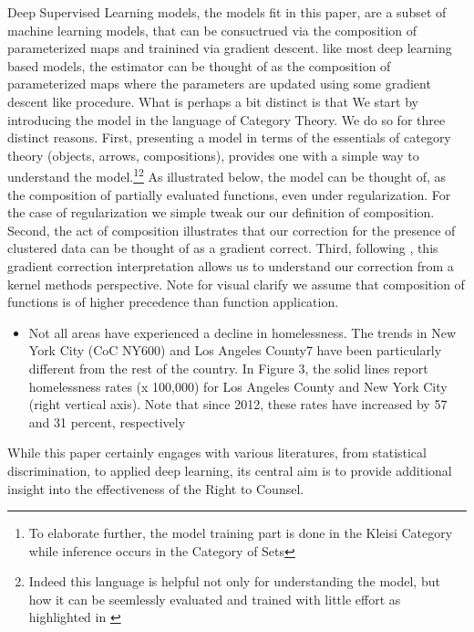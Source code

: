 \documentclass[a4paper,12pt]{article}
\begin{document}
Deep Supervised Learning models, the models fit in this paper, are a subset of machine learning models, that can be consuctrued via the composition of parameterized maps and trainined via gradient descent. 
like most deep learning based models, the estimator can be thought of as the composition of parameterized maps where the parameters are updated using some gradient descent like procedure. What is perhaps a bit distinct is that We start by introducing the model in the language of Category Theory. We do so for three distinct reasons. First, presenting a model in terms of the essentials of category theory (objects, arrows, compositions), provides one with a simple way to understand the model.\footnote{To elaborate further, the model training part is done in the Kleisi Category while inference occurs in the Category of Sets}\footnote{Indeed this language is helpful not only for understanding the model, but how it can be seemlessly evaluated and trained with little effort as highlighted in \cite{frostig2018compiling}} As illustrated below, the model can be thought of, as the composition of partially evaluated functions, even under regularization. For the case of regularization we simple tweak our our definition of composition. Second, the act of composition illustrates that our correction for the presence of clustered data can be thought of as a gradient correct. Third, following \cite{domingos2020every}, this gradient correction interpretation allows us to understand our correction from a kernel methods perspective. Note for visual clarify we assume that composition of functions is of higher precedence than function application.



\begin{itemize}
    \item Not all areas have experienced a decline in homelessness. The trends in New York City (CoC NY600) and Los Angeles County7 have been particularly different from the rest of the country. In Figure 3, the solid lines report homelessness rates (x 100,000) for Los Angeles County and New York City (right vertical
axis). Note that since 2012, these rates have increased by 57 and 31 percent, respectively
\end{itemize}
While this paper certainly engages with various literatures, from statistical discrimination, to applied deep learning, its central aim is to provide additional insight into the effectiveness of the Right to Counsel. \par 
\end{document}
